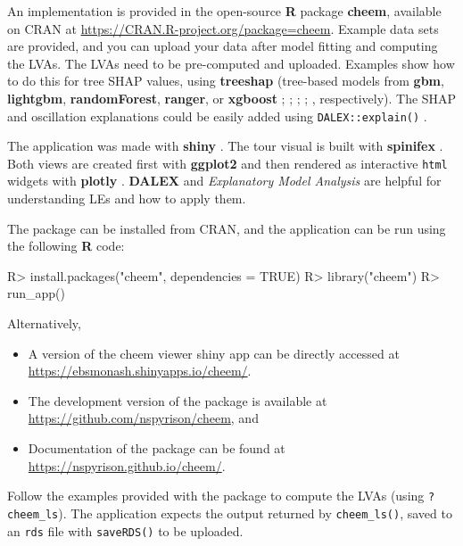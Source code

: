 \documentclass[
]{jss}
\providecommand{\tightlist}{%
  \setlength{\itemsep}{0pt}\setlength{\parskip}{0pt}}
\begin{document}
An implementation is provided in the open-source \textbf{R} package
\textbf{cheem}, available on CRAN at
\url{https://CRAN.R-project.org/package=cheem}. Example data sets are
provided, and you can upload your data after model fitting and computing
the LVAs. The LVAs need to be pre-computed and uploaded. Examples show
how to do this for tree SHAP values, using \textbf{treeshap} (tree-based
models from \textbf{gbm}, \textbf{lightgbm}, \textbf{randomForest},
\textbf{ranger}, or \textbf{xgboost} \citet{greenwell_gbm_2020};
\citet{shi_lightgbm_2022}; \citet{liaw_classification_2002};
\citet{wright_ranger_2017}; \citet{chen_xgboost_2021}, respectively).
The SHAP and oscillation explanations could be easily added using
\texttt{DALEX::explain()}
\citep{biecek_dalex_2018, biecek_explanatory_2021}.

The application was made with \textbf{shiny} \citep{chang_shiny_2021}.
The tour visual is built with \textbf{spinifex}
\citep{spyrison_spinifex_2020}. Both views are created first with
\textbf{ggplot2} \citep{wickham_ggplot2_2016} and then rendered as
interactive \texttt{html} widgets with \textbf{plotly}
\citep{sievert_interactive_2020}. \textbf{DALEX}
\citep{biecek_dalex_2018} and \emph{Explanatory Model Analysis}
\citep{biecek_explanatory_2021} are helpful for understanding LEs and
how to apply them.

The package can be installed from CRAN, and the application can be run
using the following \textbf{R} code:

\begin{CodeChunk}
\begin{CodeInput}
R> install.packages("cheem", dependencies = TRUE)
R> library("cheem")
R> run_app()
\end{CodeInput}
\end{CodeChunk}

Alternatively,

\begin{itemize}
\tightlist
\item
  A version of the cheem viewer shiny app can be directly accessed at
  \url{https://ebsmonash.shinyapps.io/cheem/}.
\item
  The development version of the package is available at
  \url{https://github.com/nspyrison/cheem}, and
\item
  Documentation of the package can be found at
  \url{https://nspyrison.github.io/cheem/}.
\end{itemize}

Follow the examples provided with the package to compute the LVAs (using
\texttt{?cheem\_ls}). The application expects the output returned by
\texttt{cheem\_ls()}, saved to an \texttt{rds} file with
\texttt{saveRDS()} to be uploaded.
\end{document}
